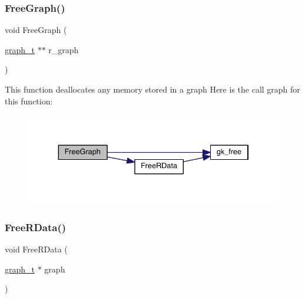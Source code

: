 \subsubsection{\texorpdfstring{Free\+Graph()}{FreeGraph()}}
{\footnotesize\ttfamily void Free\+Graph (\begin{DoxyParamCaption}\item[{\hyperlink{a00734}{graph\+\_\+t} $\ast$$\ast$}]{r\+\_\+graph }\end{DoxyParamCaption})}

This function deallocates any memory stored in a graph Here is the call graph for this function\+:\nopagebreak
\begin{figure}[H]
\begin{center}
\leavevmode
\includegraphics[width=334pt]{a00849_a6af2646733e761482dafebbb5e351240_cgraph}
\end{center}
\end{figure}
\mbox{\label{a00849_a12a6bda050dc470113f4d1cd5aa5777d}} 
\subsubsection{\texorpdfstring{Free\+R\+Data()}{FreeRData()}}
{\footnotesize\ttfamily void Free\+R\+Data (\begin{DoxyParamCaption}\item[{\hyperlink{a00734}{graph\+\_\+t} $\ast$}]{graph }\end{DoxyParamCaption})}

